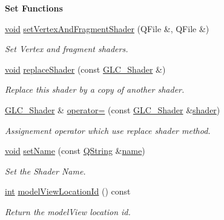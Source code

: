 \begin{Indent}{\bf Set Functions}\par
\begin{DoxyCompactItemize}
\item 
\hyperlink{group___u_a_v_objects_plugin_ga444cf2ff3f0ecbe028adce838d373f5c}{void} \hyperlink{class_g_l_c___shader_a77118ea9ce1dbf7df2ae38f3d268c1c6}{set\-Vertex\-And\-Fragment\-Shader} (Q\-File \&, Q\-File \&)
\begin{DoxyCompactList}\small\item\em Set Vertex and fragment shaders. \end{DoxyCompactList}\item 
\hyperlink{group___u_a_v_objects_plugin_ga444cf2ff3f0ecbe028adce838d373f5c}{void} \hyperlink{class_g_l_c___shader_a4fb36bea18d0f11978a3be7b4dada0e7}{replace\-Shader} (const \hyperlink{class_g_l_c___shader}{G\-L\-C\-\_\-\-Shader} \&)
\begin{DoxyCompactList}\small\item\em Replace this shader by a copy of another shader. \end{DoxyCompactList}\item 
\hyperlink{class_g_l_c___shader}{G\-L\-C\-\_\-\-Shader} \& \hyperlink{class_g_l_c___shader_a71071a2a1b7f822a06bde6b30ca5c164}{operator=} (const \hyperlink{class_g_l_c___shader}{G\-L\-C\-\_\-\-Shader} \&\hyperlink{glext_8h_a57b2a96adb1d51204909a82d861e395e}{shader})
\begin{DoxyCompactList}\small\item\em Assignement operator which use replace shader method. \end{DoxyCompactList}\item 
\hyperlink{group___u_a_v_objects_plugin_ga444cf2ff3f0ecbe028adce838d373f5c}{void} \hyperlink{class_g_l_c___shader_a9883de175dd2c14db10367c224217faf}{set\-Name} (const \hyperlink{group___u_a_v_objects_plugin_gab9d252f49c333c94a72f97ce3105a32d}{Q\-String} \&\hyperlink{glext_8h_ad977737dfc9a274a62741b9500c49a32}{name})
\begin{DoxyCompactList}\small\item\em Set the Shader Name. \end{DoxyCompactList}\item 
\hyperlink{ioapi_8h_a787fa3cf048117ba7123753c1e74fcd6}{int} \hyperlink{class_g_l_c___shader_a31f00779d7cb7f33e4c8990a4dbf8435}{model\-View\-Location\-Id} () const 
\begin{DoxyCompactList}\small\item\em Return the model\-View location id. \end{DoxyCompactList}\item 

\end{DoxyCompactItemize}
\end{Indent}
